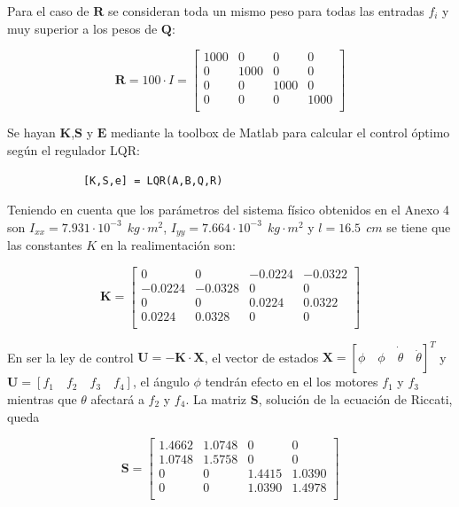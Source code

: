 \documentclass[twoside,11pt]{book}
\begin{document}
Para el caso de $\mathbf{R}$ se consideran toda un mismo peso para todas las entradas $f_i$ y muy superior a los pesos de $\mathbf{Q}$: 

\begin{equation}
\mathbf{R}=100 \cdot I = \left[ \begin{array}{cccc}
1000 &   0 &   0 &   0 \\
0   & 1000 &   0 &   0 \\
0   &   0 & 1000 &   0 \\
0   &   0 &   0 & 1000 \\ \end{array} \right] 
\end{equation}

Se hayan $\mathbf{K}$,$\mathbf{S}$ y $ \mathbf{E}$ mediante la toolbox de Matlab para calcular el control óptimo según el regulador LQR\cite{Toolbox_lqr}:

\begin{verbatim}
            [K,S,e] = LQR(A,B,Q,R)
\end{verbatim}

Teniendo en cuenta que los parámetros del sistema físico obtenidos en el Anexo 4 son $I_{xx}=7.931\cdot 10^{-3} \>\> kg \cdot m^{2}$, $I_{yy}=7.664\cdot 10^{-3}\>\> kg \cdot m^{2}$ y $l=16.5 \>\> cm$ se tiene que las constantes $K$ en la realimentación son:

\begin{equation}
\mathbf{K}= \left[ \begin{array}{cccc}
         0  &      0  &  -0.0224  & -0.0322 \\
   -0.0224 &   -0.0328    &     0    &     0 \\
         0    &     0 &   0.0224  &  0.0322 \\
    0.0224  &  0.0328    &     0    &     0 \\ \end{array} \right]
\end{equation}

En ser la ley de control $\pmb{U}=-\mathbf{K}\cdot \mathbf{X}$, el vector de estados $\mathbf{X}=[\phi \quad \dot{\phi \quad \theta \quad \dot{\theta}}]^{T}$ y $\mathbf{U}=[f_{1} \quad f_{2} \quad f_{3} \quad f_{4}]$, el ángulo $\phi$ tendrán efecto en el los motores $f_{1}$ y  $f_{3}$ mientras que $\theta$ afectará a $f_{2}$ y $f_{4}$. La matriz $\mathbf{S}$, solución de la ecuación de Riccati, queda

\begin{equation}
\mathbf{S}= \left[ \begin{array}{cccc}

    1.4662  &  1.0748    &     0 &        0 \\
    1.0748  &  1.5758    &     0   &      0 \\
         0  &       0  &  1.4415  &  1.0390 \\
         0   &      0  & 1.0390  &  1.4978 \\ \end{array}     \right]
\end{equation}
\end{document}
